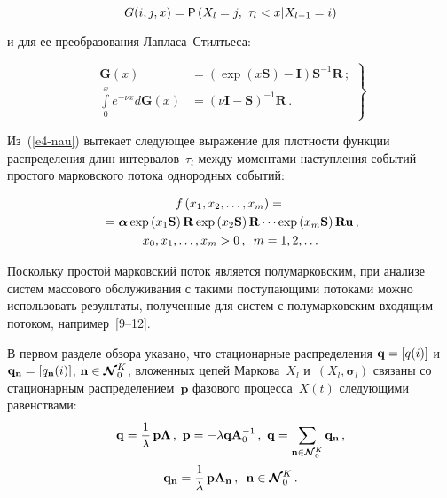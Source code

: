 \begin{multicols}{2}
\vspace*{3pt}

\noindent
  $$
  G(i,j,x)={\sf P} \left( X_l=j,\ \tau_l<x\vert X_{l-1}=i\right)
  $$
  
  \vspace*{-1pt}
  
  \noindent
 и для ее преобразования Лап\-ла\-са--Стилть\-еса:
 
 \vspace*{2pt}
 
 \noindent
\begin{equation}
\left.
\begin{array}{rl}
\mathbf{G}(x)&=\left( \exp (x\mathbf{S})-\mathbf{I}\right) \mathbf{S}^{-
1}\mathbf{R}\,;\\
\displaystyle\int\limits_0^x e^{-\nu x}d\mathbf{G}(x)&=(\nu\mathbf{I}-\mathbf{S})^{-1}\mathbf{R}\,.
\end{array}
\right\}
\label{e5-nau}
\end{equation}

\vspace*{-2pt}
  
  Из~(\ref{e4-nau}) вытекает следующее выражение для плотности функции 
распределения длин интервалов~$\tau_l$ между моментами наступления 
событий простого марковского потока однородных событий:

\vspace*{-8pt}

\noindent
  \begin{multline}
  f\left( x_1, x_2, \ldots, x_m\right)={}\\
  {}=\bm{\alpha}\exp \left(x_1\mathbf{S}\right) 
\mathbf{R}\exp \left( x_2\mathbf{S}\right)\mathbf{R}\cdots \exp \left( 
x_m\mathbf{S}\right) \mathbf{Ru}\,,\\
  x_0, x_1,\ldots , x_m>0\,,\enskip m=1,2,\ldots
  \label{e6-nau}
  \end{multline}
  
  \vspace*{-2pt}
  
  Поскольку простой марковский поток является полумарковским, при 
анализе систем массового обслуживания с такими поступающими потоками 
можно использовать результаты, полученные для систем с полумарковским 
входящим потоком,  
например~[9--12].
   
  В первом разделе обзора указано, что стационарные распределения 
$\mathbf{q}\hm=[q(i)]$ и $\mathbf{q}_{\mathbf{n}}\hm= [q_{\mathbf{n}}(i)]$, 
$\mathbf{n}\hm\in \boldsymbol{\mathcal{N}}_0^K$, вложенных цепей 
Маркова~$X_l$ и~$(X_l, \boldsymbol{\sigma}_l)$ связаны со стационарным 
распределением~$\mathbf{p}$ фазового процесса~$X(t)$ следующими 
равенствами:
\begin{multline*}
  \mathbf{q}=\fr{1}{\lambda}\,\mathbf{p}\boldsymbol{\Lambda}\,,\
  \mathbf{p}=-\lambda \mathbf{q}\mathbf{A}_0^{-1}\,,\ 
  \mathbf{q}=\sum\limits_{\mathbf{n}\in \boldsymbol{\mathcal{N}}_0^K} 
\mathbf{q}_{\mathbf{n}}\,,\\
 \mathbf{q}_{\mathbf{n}}=\fr{1}{\lambda}\,\mathbf{p}
  \mathbf{A}_{\mathbf{n}}\,,\enskip \mathbf{n}\in \boldsymbol{\mathcal{N}}_0^K\,.
  \end{multline*}


\end{multicols}
